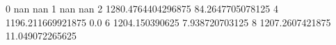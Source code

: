 0 nan nan
1 nan nan
2 1280.4764404296875 84.2647705078125
4 1196.211669921875 0.0
6 1204.150390625 7.938720703125
8 1207.2607421875 11.049072265625
